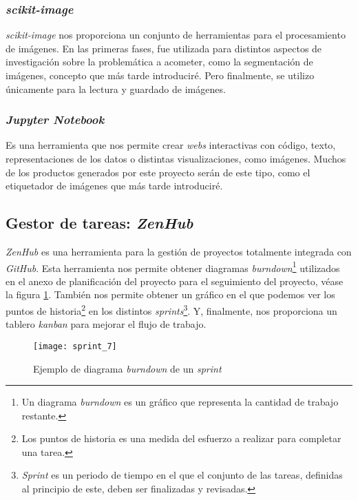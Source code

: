 \subsubsection{\textit{scikit-image}}

\textit{scikit-image} nos proporciona un conjunto de herramientas para el procesamiento de imágenes. En las primeras fases, fue utilizada para distintos aspectos de investigación sobre la problemática a acometer, como la segmentación de imágenes, concepto que más tarde introduciré. Pero finalmente, se utilizo únicamente para la lectura y guardado de imágenes.


\subsubsection{\textit{Jupyter Notebook}}

Es una herramienta que nos permite crear \textit{webs} interactivas con código, texto, representaciones de los datos o distintas visualizaciones, como imágenes. Muchos de los productos generados por este proyecto serán de este tipo, como el etiquetador de imágenes que más tarde introduciré.

\subsection{Gestor de tareas: \textit{ZenHub}}

\textit{ZenHub} es una herramienta para la gestión de proyectos totalmente integrada con \textit{GitHub}. Esta herramienta nos permite obtener diagramas \textit{burndown}\footnote{Un diagrama \textit{burndown} es un gráfico que representa la cantidad de trabajo restante.} utilizados en el anexo de planificación del proyecto para el seguimiento del proyecto, véase la figura \ref{fig:4.2.1}. También nos permite obtener un gráfico en el que podemos ver los puntos de historia\footnote{Los puntos de historia es una medida del esfuerzo a realizar para completar una tarea.} en los distintos \textit{sprints}\footnote{\textit{Sprint} es un periodo de tiempo en el que el conjunto de las tareas, definidas al principio de este, deben ser finalizadas y revisadas.}. Y, finalmente, nos proporciona un tablero \textit{kanban} para mejorar el flujo de trabajo.

\begin{figure}[h]
\centering
\texttt{[image: sprint\_7]}
\caption{Ejemplo de diagrama \textit{burndown} de un  \textit{sprint}}
\label{fig:4.2.1}
\end{figure}

